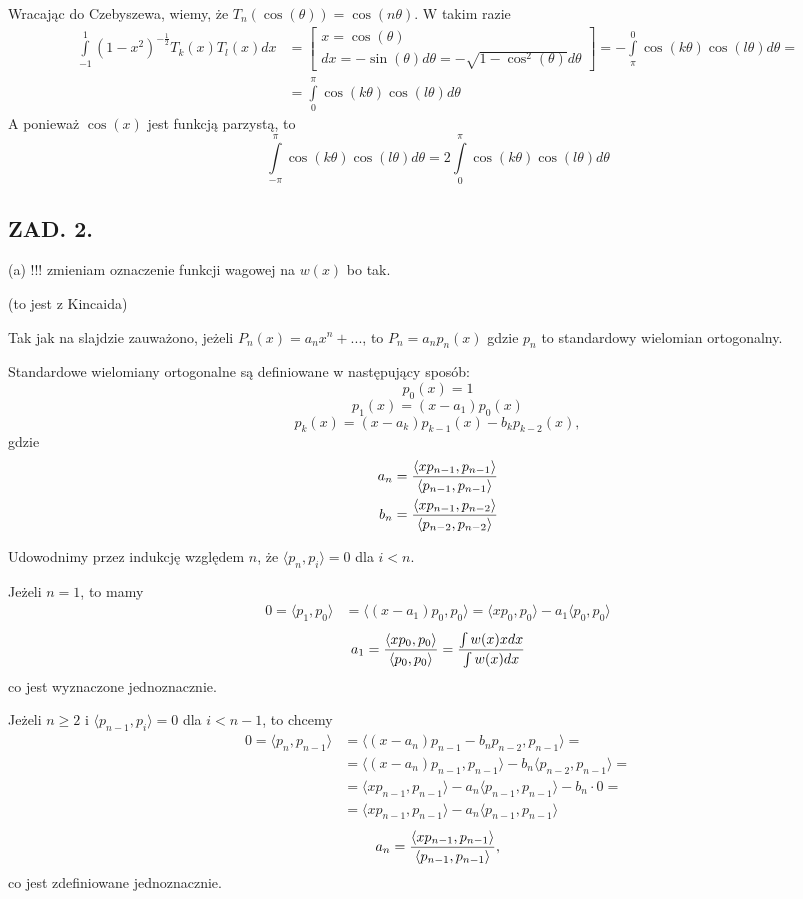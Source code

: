 \documentclass{article}[16pt]
\begin{document}
Wracając do Czebyszewa, wiemy, że $T_n(\cos(\theta))=\cos(n\theta)$. W takim razie
\begin{align*}\int\limits_{-1}^1(1-x^2)^{-\frac12}T_k(x)T_l(x)dx&=\begin{bmatrix}
    x=\cos(\theta)\\
    dx=-\sin(\theta)d\theta=-\sqrt{1-\cos^2(\theta)}d\theta
\end{bmatrix}=-\int\limits_{\pi}^0\cos(k\theta)\cos(l\theta)d\theta=\\
&=\int\limits_0^\pi\cos(k\theta)\cos(l\theta)d\theta
\end{align*}
A ponieważ $\cos(x)$ jest funkcją parzystą, to
$$\int\limits_{-\pi}^\pi\cos(k\theta)\cos(l\theta)d\theta=2\int\limits_{0}^\pi\cos(k\theta)\cos(l\theta)d\theta$$

\subsection*{ZAD. 2.}

{\color{def}(a)} !!! zmieniam oznaczenie funkcji wagowej na $w(x)$ bo tak.

(to jest z Kincaida)
\smallskip

Tak jak na slajdzie zauważono, jeżeli $P_n(x)=a_nx^n+...$, to $P_n=a_np_n(x)$ gdzie $p_n$ to standardowy wielomian ortogonalny.

Standardowe wielomiany ortogonalne są definiowane w następujący sposób:
$$p_0(x)=1$$
$$p_1(x)=(x-a_1)p_0(x)$$
$$p_k(x)=(x-a_k)p_{k-1}(x)-b_kp_{k-2}(x),$$
gdzie
\begin{align*}
    a_n&={\langle xp_{n-1},p_{n-1}\rangle\over\langle p_{n-1},p_{n-1}\rangle}\\
    b_n&={\langle xp_{n-1},p_{n-2}\rangle\over\langle p_{n-2},p_{n-2}\rangle}
\end{align*}

Udowodnimy przez indukcję względem $n$, że $\langle p_n,p_i\rangle=0$ dla $i<n$.

Jeżeli $n=1$, to mamy
\begin{align*}
    0=\langle p_1, p_0\rangle &= \langle (x-a_1)p_0, p_0\rangle=\langle xp_0,p_0\rangle-a_1\langle p_0,p_0\rangle
\end{align*}
$$a_1={\langle xp_0,p_0\rangle\over \langle p_0,p_0\rangle}={\int w(x)xdx\over \int w(x)dx}$$
co jest wyznaczone jednoznacznie.

Jeżeli $n\geq 2$ i $\langle p_{n-1},p_i\rangle=0$ dla $i<n-1$, to chcemy
\begin{align*}
    0=\langle p_n,p_{n-1}\rangle&=\langle (x-a_n)p_{n-1}-b_np_{n-2},p_{n-1}\rangle=\\
    &=\langle (x-a_n)p_{n-1},p_{n-1}\rangle-b_n\langle p_{n-2},p_{n-1}\rangle=\\
    &=\langle xp_{n-1},p_{n-1}\rangle-a_n\langle p_{n-1},p_{n-1}\rangle -b_n\cdot 0=\\
    &=\langle xp_{n-1},p_{n-1}\rangle-a_n\langle p_{n-1},p_{n-1}\rangle
\end{align*}
$$a_n={\langle xp_{n-1},p_{n-1}\rangle\over \langle p_{n-1},p_{n-1}\rangle},$$
co jest zdefiniowane jednoznacznie.
\end{document}
